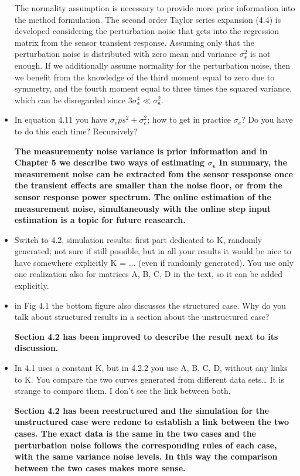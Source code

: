\documentclass[11pt]{article}
\begin{document}
\begin{itemize}
	\color{blue}
	The normality assumption is necessary to provide more prior information into the method formulation.
    The second order Taylor series expansion (4.4) is developed considering the perturbation noise that gets into the regression matrix from the sensor transient response.
    Assuming only that the perturbation noise is distributed with zero mean and variance $\sigma_{\bm{\epsilon}}^2$ is not enough.
    If we additionally assume normality for the perturbation noise, then we benefit from the knowledge of the third moment equal to zero due to symmetry, and the fourth moment equal to three times the squared variance, which can be disregarded since $3 \sigma_{\bm{\epsilon}}^4 \ll \sigma_{\bm{\epsilon}}^2$\color{black}.
	
	\item   In equation 4.11 you have $\sigma_eps^2 + \sigma_e^2$; how to get in practice $\sigma_e$? Do you have to do this each time? Recursively?
	
	{\bfseries The measurementy noise variance is prior information and in Chapter 5 we describe two ways of estimating $\sigma_{\bm{\epsilon}}$ In summary, the measurement noise can be extracted fom the sensor ressponse once the transient effects are smaller than the noise floor, or from the sensor response power spectrum. The online estimation of the measurement noise, simultaneously with the online step input estimation is a topic for future reasearch.   }
	
	
	\item   Switch to 4.2, simulation results: first part dedicated to K, randomly generated; not sure if still possible, but in all your results it would be nice to have somewhere explicitly K = ... (even if randomly generated). You use only one realization also for matrices A, B, C, D in the text, so it can be added explicitly.
	\item   in Fig 4.1 the bottom figure also discusses the structured case. Why do you talk about structured results in a section about the unstructured case?
	
	{\bfseries Section 4.2 has been improved to describe the result next to its discussion.  }
	
	\item   In 4.1 uses a constant K, but in 4.2.2 you use A, B, C, D, without any links to K. You compare the two curves generated from different data sets… It is strange to compare them. I don't see the link between both.
	
	{\bfseries Section 4.2 has been reestructured and the simulation for the unstructured case were redone to establish a link between the two cases. The exact data is the same in the two cases and the perturbation noise follows the corresponding rules of each case, with the same variance noise levels. In this way the comparison between the two cases makes more sense.  }
	

\end{itemize}
\end{document}

